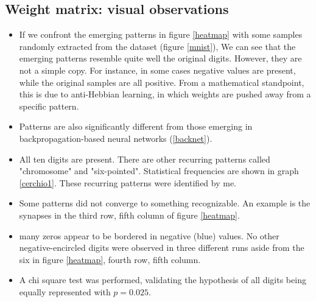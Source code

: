 \documentclass[a4paper]{report}
\begin{document}
\subsection{Weight matrix: visual observations}

\begin{itemize}
    \item If we confront the emerging patterns in figure \ref{heatmap} with some samples randomly extracted from the dataset (figure \ref{mnist}), We can see that the emerging patterns resemble quite well the original digits. However, they are not a simple copy. For instance, in some cases negative values are present, while the original samples are all positive. From a mathematical standpoint, this is due to anti-Hebbian learning, in which weights are pushed away from a specific pattern.
    \item Patterns are also significantly different from those emerging in backpropagation-based neural networks (\ref{backnet}).
    \item All ten digits are present. There are other recurring patterns called "chromosome" and "six-pointed". Statistical frequencies are shown in graph \ref{cerchio1}. These recurring patterns were identified by me.
    \item Some patterns did not converge to something recognizable. An example is the synapses in the third row, fifth column of figure \ref{heatmap}.
    \item many zeros appear to be bordered in negative (blue) values. No other negative-encircled digits were observed in three different runs aside from the six in figure \ref{heatmap}, fourth row, fifth column.
    \item A chi square test was performed, validating the hypothesis of all digits being equally represented with $p  = 0.025$.
    \end{itemize}
\end{document}
